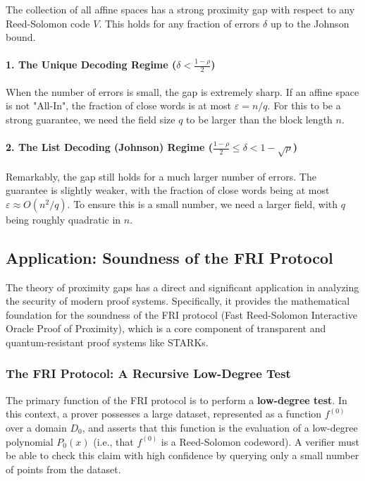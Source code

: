 \documentclass{article}
\begin{document}
\begin{tcolorbox}[breakable, title={Theorem (Informal): Proximity Gap for RS Codes}]
The collection of all affine spaces has a strong proximity gap with respect to any Reed-Solomon code $V$. This holds for any fraction of errors $\delta$ up to the Johnson bound.

\paragraph{1. The Unique Decoding Regime ($\delta < \frac{1-\rho}{2}$)}
When the number of errors is small, the gap is extremely sharp. If an affine space is not "All-In", the fraction of close words is at most $\varepsilon = n/q$. For this to be a strong guarantee, we need the field size $q$ to be larger than the block length $n$.

\paragraph{2. The List Decoding (Johnson) Regime ($\frac{1-\rho}{2} \le \delta < 1 - \sqrt{\rho}$)}
Remarkably, the gap still holds for a much larger number of errors. The guarantee is slightly weaker, with the fraction of close words being at most $\varepsilon \approx O(n^2/q)$. To ensure this is a small number, we need a larger field, with $q$ being roughly quadratic in $n$.
\end{tcolorbox}



\subsection{Application: Soundness of the FRI Protocol}

The theory of proximity gaps has a direct and significant application in analyzing the security of modern proof systems. Specifically, it provides the mathematical foundation for the soundness of the FRI protocol\cite{ben2018fast} (Fast Reed-Solomon Interactive Oracle Proof of Proximity), which is a core component of transparent and quantum-resistant proof systems like STARKs.

\subsubsection{The FRI Protocol: A Recursive Low-Degree Test}
The primary function of the FRI protocol is to perform a \textbf{low-degree test}. In this context, a prover possesses a large dataset, represented as a function $f^{(0)}$ over a domain $D_0$, and asserts that this function is the evaluation of a low-degree polynomial $P_0(x)$ (i.e., that $f^{(0)}$ is a Reed-Solomon codeword). A verifier must be able to check this claim with high confidence by querying only a small number of points from the dataset.
\end{document}
